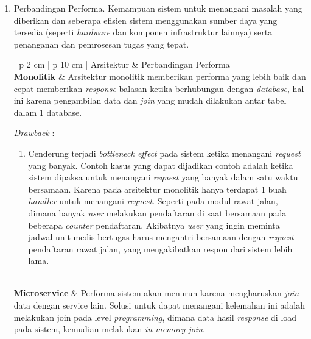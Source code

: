 \begin{enumerate}[leftmargin=*]
\begin{table}[H]
\begin{adjustbox}{width=1\textwidth}
\begin{tabular}{| p {2 cm} | p {10 cm} |}
				\textit{Drawback} : 
				\begin{enumerate}[leftmargin=*]
					\item Tidak 100\% menghilangkan tingkat \textit{coupling}. Perubahan pada objek atau alamat dari\textit{web API} masih perlu diketahui oleh tim pengembang lain.
				\end{enumerate}\\
				\hline
			\end{tabular}
		\end{adjustbox}
	\end{table}
	\newpage
	\item Perbandingan Performa. Kemampuan sistem untuk menangani masalah yang diberikan dan seberapa efisien sistem menggunakan sumber daya yang tersedia (seperti \textit{hardware} dan komponen infrastruktur lainnya) serta penanganan dan pemrosesan tugas yang tepat.
	\begin{table}[H]
		\small
		\begin{adjustbox}{width=1\textwidth}
			\begin{tabular}{| p {2 cm} | p {10 cm} |}
				\hline
				Arsitektur & Perbandingan Performa\\
				\hline
				\textbf{Monolitik} & Arsitektur monolitik memberikan performa yang lebih baik dan cepat memberikan \textit{response} balasan ketika berhubungan dengan \textit{database}, hal ini karena pengambilan data dan \textit{join} yang mudah dilakukan antar tabel dalam 1 database.
				
				\textit{Drawback} :
				\begin{enumerate}[leftmargin=*]
					\item Cenderung terjadi \textit{bottleneck effect} pada sistem ketika menangani \textit{request} yang banyak. Contoh kasus yang dapat dijadikan contoh adalah ketika sistem dipaksa untuk menangani \textit{request} yang banyak dalam satu waktu bersamaan. Karena pada arsitektur monolitik hanya terdapat 1 buah \textit{handler} untuk menangani \textit{request}. Seperti pada modul rawat jalan, dimana banyak \textit{user} melakukan pendaftaran di saat bersamaan pada beberapa \textit{counter} pendaftaran. Akibatnya \textit{user} yang ingin meminta jadwal unit medis bertugas harus mengantri bersamaan dengan \textit{request} pendaftaran rawat jalan, yang mengakibatkan respon dari sistem lebih lama.
				\end{enumerate}\\
				\hline
				\textbf{Microservice} & Performa sistem akan menurun karena mengharuskan \textit{join} data dengan service lain. Solusi untuk dapat menangani kelemahan ini adalah melakukan join pada level \textit{programming}, dimana data hasil \textit{response} di load pada sistem, kemudian melakukan \textit{in-memory join}.
				

\end{tabular}
\end{adjustbox}
\end{table}
\end{enumerate}
